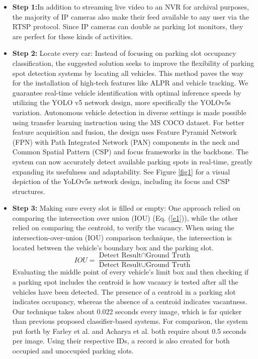 \documentclass[conference]{IEEEtran}
\begin{document}
\begin{itemize}
    \item \textbf{Step 1:}In addition to streaming live video to an NVR for archival purposes, the majority of IP cameras also make their feed available to any user via the RTSP protocol. Since IP cameras can double as parking lot monitors, they are perfect for these kinds of activities.
    \item \textbf{Step 2:} Locate every car: Instead of focusing on parking slot occupancy classification, the suggested solution seeks to improve the flexibility of parking spot detection systems by locating all vehicles. This method paves the way for the installation of high-tech features like ALPR and vehicle tracking. We guarantee real-time vehicle identification with optimal inference speeds by utilizing the YOLO v5 network design, more specifically the YOLOv5s variation. Autonomous vehicle detection in diverse settings is made possible using transfer learning instruction using the MS COCO dataset. For better feature acquisition and fusion, the design uses Feature Pyramid Network (FPN) with Path Integrated Network (PAN) components in the neck and Common Spatial Pattern (CSP) and focus frameworks in the backbone. The system can now accurately detect available parking spots in real-time, greatly expanding its usefulness and adaptability. See Figure \ref{fig1} for a visual depiction of the YoLOv5s network design, including its focus and CSP structures.
    \item \textbf{Step 3:} Making sure every slot is filled or empty: One approach relied on comparing the intersection over union (IOU) (Eq. (\ref{e1})), while the other relied on comparing the centroid, to verify the vacancy. When using the intersection-over-union (IOU) comparison technique, the intersection is located between the vehicle's boundary box and the parking slot. 
    \begin{equation}\label{e1}
        IOU = \frac{\text{Detect Result} \cap \text{Ground Truth}}{\text{Detect Result} \cup \text{Ground Truth}}
    \end{equation}
    Evaluating the middle point of every vehicle's limit box and then checking if a parking spot includes the centroid is how vacancy is tested after all the vehicles have been detected. The presence of a centroid in a parking slot indicates occupancy, whereas the absence of a centroid indicates vacantness. Our technique takes about 0.022 seconds every image, which is far quicker than previous proposed classifier-based systems. For comparison, the system put forth by Farley et al. \cite{farley2021real}and Acharya et al. \cite{acharya2018real} both require about 0.5 seconds per image. Using their respective IDs, a record is also created for both occupied and unoccupied parking slots.

\end{itemize}
\end{document}
